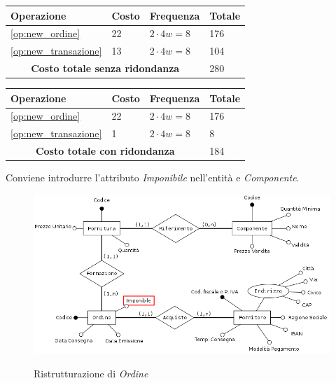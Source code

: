 					\vspace{2ex}
					\begin{tabular}{| p{3cm} | p{3cm} | p{3cm} | p{3cm} |}
						\hline
						\textbf{Operazione} & \textbf{Costo} & \textbf{Frequenza} & \textbf{Totale} \\ \hline
						\ref{op:new_ordine} & 22 & $2 \cdot 4w = 8$ & 176 \\
						\ref{op:new_transazione} & 13 & $2 \cdot 4w = 8$ & 104 \\
						\hline
						\multicolumn{3}{|c|}{\textbf{Costo totale senza ridondanza}} & 280 \\
						\hline
					\end{tabular}

					\begin{tabular}{| p{3cm} | p{3cm} | p{3cm} | p{3cm} |}
						\hline
						\textbf{Operazione} & \textbf{Costo} & \textbf{Frequenza} & \textbf{Totale} \\ \hline
						\ref{op:new_ordine} & 22 & $2 \cdot 4w = 8$ & 176 \\
						\ref{op:new_transazione} & 1 & $2 \cdot 4w = 8$ & 8 \\
						\hline
						\multicolumn{3}{|c|}{\textbf{Costo totale con ridondanza}} & 184 \\
						\hline

					\end{tabular}
					\vspace{2ex}

					Conviene introdurre l'attributo \emph{Imponibile} nell'entità e \emph{Componente}.

					\begin{figure}[H]
						\includegraphics[width=12cm]{images/refactor/fornitore_ordine_fornitura_componente.png}
						\centering
						\label{fig:ordine_refactor}
						\caption{Ristrutturazione di \emph{Ordine}}
					\end{figure}

